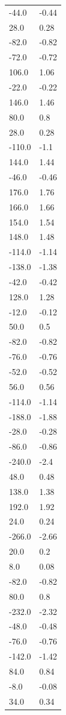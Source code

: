\begin{longtable}{ll}
-44.0 & -0.44 \\
28.0 & 0.28 \\
-82.0 & -0.82 \\
-72.0 & -0.72 \\
106.0 & 1.06 \\
-22.0 & -0.22 \\
146.0 & 1.46 \\
80.0 & 0.8 \\
28.0 & 0.28 \\
-110.0 & -1.1 \\
144.0 & 1.44 \\
-46.0 & -0.46 \\
176.0 & 1.76 \\
166.0 & 1.66 \\
154.0 & 1.54 \\
148.0 & 1.48 \\
-114.0 & -1.14 \\
-138.0 & -1.38 \\
-42.0 & -0.42 \\
128.0 & 1.28 \\
-12.0 & -0.12 \\
50.0 & 0.5 \\
-82.0 & -0.82 \\
-76.0 & -0.76 \\
-52.0 & -0.52 \\
56.0 & 0.56 \\
-114.0 & -1.14 \\
-188.0 & -1.88 \\
-28.0 & -0.28 \\
-86.0 & -0.86 \\
-240.0 & -2.4 \\
48.0 & 0.48 \\
138.0 & 1.38 \\
192.0 & 1.92 \\
24.0 & 0.24 \\
-266.0 & -2.66 \\
20.0 & 0.2 \\
8.0 & 0.08 \\
-82.0 & -0.82 \\
80.0 & 0.8 \\
-232.0 & -2.32 \\
-48.0 & -0.48 \\
-76.0 & -0.76 \\
-142.0 & -1.42 \\
84.0 & 0.84 \\
-8.0 & -0.08 \\
34.0 & 0.34 \\

\end{longtable}
